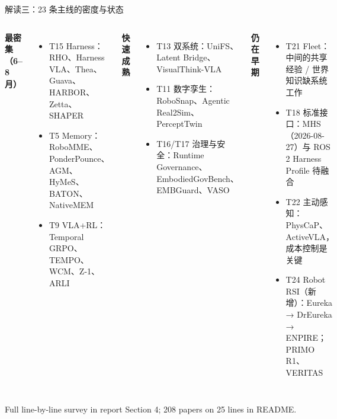 \documentclass[aspectratio=169,10pt]{beamer}
\newcommand{\en}[1]{{\footnotesize\textcolor{neutral}{#1}}}
\begin{document}
\begin{frame}{解读三：23 条主线的密度与状态}
\begin{columns}[T]
\textbf{最密集（6--8 月）}
\begin{itemize}
  \item T15 Harness：RHO、Harness VLA、Thea、Guava、HARBOR、Zetta、SHAPER
  \item T5 Memory：RoboMME、PonderPounce、AGM、HyMeS、BATON、NativeMEM
  \item T9 VLA+RL：Temporal GRPO、TEMPO、WCM、Z-1、ARLI
\end{itemize}
\textbf{快速成熟}
\begin{itemize}
  \item T13 双系统：UniFS、Latent Bridge、VisualThink-VLA
  \item T11 数字孪生：RoboSnap、Agentic Real2Sim、PerceptTwin
  \item T16/T17 治理与安全：Runtime Governance、EmbodiedGovBench、EMBGuard、VASO
\end{itemize}
\textbf{仍在早期}
\begin{itemize}
  \item T21 Fleet：中间的共享经验 / 世界知识缺系统工作
  \item T18 标准接口：MHS（2026-08-27）与 ROS 2 Harness Profile 待融合
  \item T22 主动感知：PhysCaP、ActiveVLA，成本控制是关键
  \item T24 Robot RSI（新增）：Eureka → DrEureka → ENPIRE；PRIMO R1、VERITAS
\end{itemize}
\end{columns}
\vspace{4pt}
\en{Full line-by-line survey in report Section 4; 208 papers on 25 lines in README.}
\end{frame}
\end{document}
